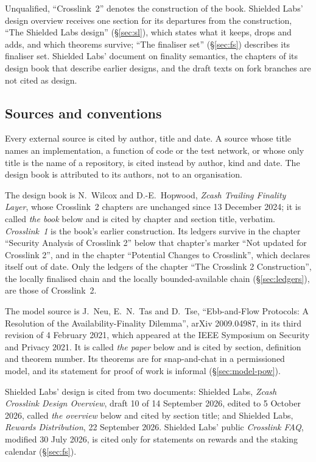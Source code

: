 \documentclass[11pt,a4paper]{article}
\theoremstyle{definition}
\begin{document}
Unqualified, ``Crosslink~2'' denotes the construction of the book. Shielded
Labs' design overview receives one section for its departures from the
construction, ``The Shielded Labs design'' (\S\ref{sec:sl}), which states
what it keeps, drops and adds, and which theorems survive; ``The finaliser
set'' (\S\ref{sec:fs}) describes its finaliser set. Shielded Labs' document on
finality semantics, the chapters of its design book that describe earlier
designs, and the draft texts on fork branches are not cited as design.

\subsection{Sources and conventions}\label{sec:intro-sources}

Every external source is cited by author, title and date. A source whose
title names an implementation, a function of code or the test network, or
whose only title is the name of a repository, is cited instead by author,
kind and date. The design book is attributed to its authors, not to an
organisation.

The design book is N.~Wilcox and D.-E.~Hopwood, \emph{Zcash Trailing
Finality Layer}, whose Crosslink~2 chapters are unchanged since 13 December
2024; it is called \emph{the book} below and is cited by chapter and section
title, verbatim. \emph{Crosslink~1} is the book's earlier construction. Its
ledgers survive in the chapter ``Security Analysis of Crosslink 2'' below
that chapter's marker ``Not updated for Crosslink 2'', and in the chapter
``Potential Changes to Crosslink'', which declares itself out of date. Only
the ledgers of the chapter ``The Crosslink 2 Construction'', the locally
finalised chain and the locally bounded-available chain (\S\ref{sec:ledgers}),
are those of Crosslink~2.

The model source is J.~Neu, E.~N.~Tas and D.~Tse, ``Ebb-and-Flow Protocols:
A Resolution of the Availability-Finality Dilemma'', arXiv 2009.04987, in its
third revision of 4 February 2021, which appeared at the IEEE Symposium on
Security and Privacy 2021. It is called \emph{the paper} below and is cited by
section, definition and theorem number. Its theorems are for snap-and-chat in
a permissioned model, and its statement for proof of work is informal
(\S\ref{sec:model-pow}).

Shielded Labs' design is cited from two documents: Shielded Labs,
\emph{Zcash Crosslink Design Overview}, draft 10 of 14 September 2026,
edited to 5 October 2026, called \emph{the overview} below and cited by
section title; and Shielded Labs, \emph{Rewards Distribution}, 22 September
2026. Shielded Labs' public \emph{Crosslink FAQ}, modified 30 July 2026, is
cited only for statements on rewards and the staking calendar
(\S\ref{sec:fs}).
\end{document}
